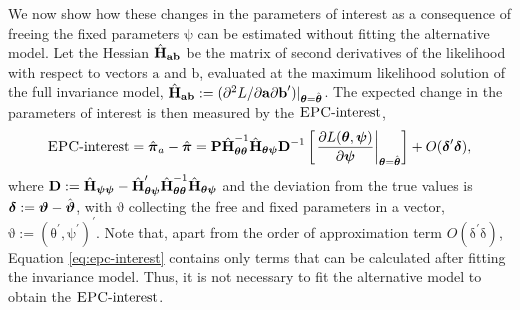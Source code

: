 \documentclass[letterpaper,12pt]{article}
\newcommand\vm[1]{%
\bm{\mathrm{#1}}}
\newcommand{\param}{\vm{\theta}}
\newcommand{\bpsi}{\vm{\psi}}
\newcommand{\that}{\hat{\vm{\theta}}}
\newcommand{\da}{\textrm{{\sc {EPC}}-interest}}
\begin{document}
We now show how these changes in the parameters of interest as a consequence of freeing the fixed parameters $\bpsi$ can be estimated without fitting the alternative model. Let the Hessian $\hat{\vm{H}}_{\vm{a}\vm{b}}$ be the matrix of second derivatives of the likelihood with respect to vectors $\vm{a}$ and $\vm{b}$, evaluated at the maximum likelihood solution of the full invariance model, $\hat{\vm{H}}_{\vm{a}\vm{b}} := (\partial^2 L /\partial \vm{a} \partial \vm{b}^\prime)|_{\param=\that}$. 
The expected change in the parameters of interest is then measured by the $\da$, 
\begin{equation}
\da = \hat{\vm{\pi}}_a - \hat{\vm{\pi}} = \vm{P}
\hat{\vm{H}}^{-1}_{\param\param} \hat{\vm{H}}_{\param\bpsi}\vm{D}^{-1}
		\left[ \left.\frac{\partial L(\param, \bpsi)}{\partial \bpsi}\right|_{\param = \that} \right] +	
		O(\vm{\delta}^\prime\vm{\delta}),
		\label{eq:epc-interest}
\end{equation}
where $\vm{D}:= \hat{\vm{H}}_{\bpsi\bpsi} - \hat{\vm{H}}_{\param\bpsi}^\prime \hat{\vm{H}}^{-1}_{\param\param} \hat{\vm{H}}_{\param\bpsi}$ and the deviation from the true values is $\vm{\delta}:= \vm{\vartheta} - \hat{\vm{\vartheta}}$, with $\vm{\vartheta}$ collecting the free and fixed parameters in a vector, $\vm{\vartheta}:= (\param^\prime, \bpsi^\prime)^\prime$. Note that, apart from the order of approximation term $O(\vm{\delta}^\prime \vm{\delta})$,  Equation \ref{eq:epc-interest} contains only terms that can be calculated after fitting the invariance model.
 Thus, it is not necessary to fit the alternative model to obtain the $\da{}$.
\end{document}
